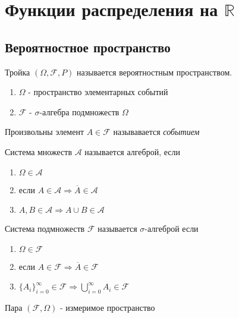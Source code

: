 \section{Функции распределения на $\mathbb{R}$}

\subsection{Вероятностное пространство}
Тройка
$
(\Omega, \mathcal{F}, P)
$
называется вероятностным пространством.

\begin{enumerate}
	\item $ \Omega $ - пространство элементарных событий
	\item $ \mathcal{F} $ - $ \sigma\text{-алгебра}  $  подмножеств $ \Omega $
\end{enumerate}

\begin{definition}
Произвольны элемент	$ A \in \mathcal{F} $ называвается \textit{событием}
\end{definition}

\begin{definition}
	Система множеств $\mathcal{A}$ называется
	алгеброй, если
	\begin{enumerate}
		\item $\Omega \in \mathcal{A}$
		\item если $ A \in \mathcal{A}   \Longrightarrow  
		\overline{A} \in \mathcal{A} $
		\item $ A,B \in \mathcal{A} \Longrightarrow A \cup B \in \mathcal{A}
		 $
	\end{enumerate}	
	
\end{definition}	


\begin{definition}
	Система подмножеств $ \mathcal{F}  $ называется $ \sigma\text{-алгеброй}  $ если
	\begin{enumerate}
	\item $\Omega \in \mathcal{F}$
	\item если $ A \in \mathcal{F}   \Longrightarrow  
	\overline{A} \in \mathcal{F} $
	\item
	$\displaystyle \lbrace A_i \rbrace^{\infty}_{i=0} \in \mathcal{F} \Longrightarrow \bigcup^{\infty}_{i=0} A_i \in \mathcal{F}$
	\end{enumerate}
\end{definition}

\begin{definition}
	Пара $ (\mathcal{F}, \Omega) $ - измеримое пространство
\end{definition}	


